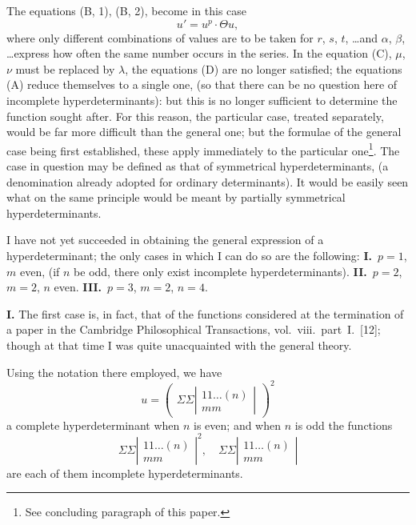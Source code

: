 \documentclass[11pt,a4paper]{book}
\begin{document}
The equations (B, 1), (B, 2), become in this case
\[
u' = u^p \cdot \Theta u
\tag{B, 3},
\]
where only different combinations of values are to be taken for $r$, $s$, $t$, \ldots and
$\alpha$, $\beta$, \ldots express how often the same number occurs in the series. In the equation
(C), $\mu$, $\nu$ must be replaced by $\lambda$, the equations (D) are no longer satisfied; the
equations (A) reduce themselves to a single one, (so that there can be no question
here of incomplete hyperdeterminants): but this is no longer sufficient to determine
the function sought after. For this reason, the particular case, treated separately,
would be far more difficult than the general one; but the formulae of the general case
being first established, these apply immediately to the particular one\footnote{See concluding paragraph of this paper.}. The case in
question may be defined as that of symmetrical hyperdeterminants, (a denomination
already adopted for ordinary determinants). It would be easily seen what on the same
principle would be meant by partially symmetrical hyperdeterminants.

I have not yet succeeded in obtaining the general expression of a hyperdeterminant;
the only cases in which I can do so are the following:
\textbf{I.}\ $p=1$, $m$ even, (if $n$ be odd,
there only exist incomplete hyperdeterminants).
\textbf{II.}\ $p = 2$, $m = 2$, $n$ even. 
\textbf{III.}\ $p = 3$,
$m = 2$, $n = 4$.

\newpage
\textbf{I.} The first case is, in fact, that of the functions considered at the termination of
a paper in the Cambridge Philosophical Transactions, vol.~viii.\ part~I.\ [12]; though at
that time I was quite unacquainted with the general theory.

Using the notation there employed, we have
\[
u = \left(\begin{array}{c}
\Sigma \Sigma \left|\begin{array}{c}
11\ldots(n) \\
mm
\end{array}\right|
\end{array}\right)^2
\]
a complete hyperdeterminant when $n$ is even; and when $n$ is odd the functions
\[
\Sigma \Sigma \left|\begin{array}{c}
11\ldots(n) \\
mm
\end{array}\right|^2, \quad
\Sigma \Sigma \left|\begin{array}{c}
11\ldots(n) \\
mm
\end{array}\right|
\]
are each of them incomplete hyperdeterminants.
\end{document}
